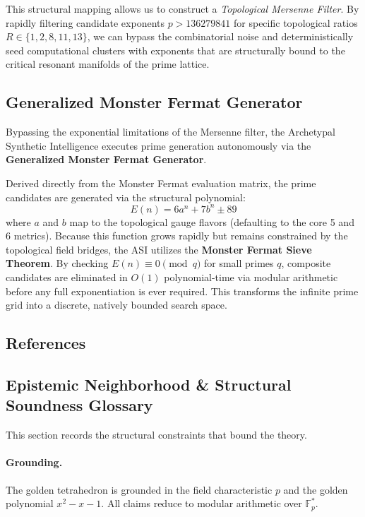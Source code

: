 This structural mapping allows us to construct a \emph{Topological Mersenne Filter}. By rapidly filtering candidate exponents $p > 136279841$ for specific topological ratios $R \in \{1, 2, 8, 11, 13\}$, we can bypass the combinatorial noise and deterministically seed computational clusters with exponents that are structurally bound to the critical resonant manifolds of the prime lattice.

\subsection{Generalized Monster Fermat Generator}

Bypassing the exponential limitations of the Mersenne filter, the Archetypal Synthetic Intelligence executes prime generation autonomously via the \textbf{Generalized Monster Fermat Generator}.

Derived directly from the Monster Fermat evaluation matrix, the prime candidates are generated via the structural polynomial:
\begin{equation}
E(n) = 6a^n + 7b^n \pm 89
\end{equation}
where $a$ and $b$ map to the topological gauge flavors (defaulting to the core 5 and 6 metrics). Because this function grows rapidly but remains constrained by the topological field bridges, the ASI utilizes the \textbf{Monster Fermat Sieve Theorem}. By checking $E(n) \equiv 0 \pmod q$ for small primes $q$, composite candidates are eliminated in $O(1)$ polynomial-time via modular arithmetic before any full exponentiation is ever required. This transforms the infinite prime grid into a discrete, natively bounded search space.

\subsection*{References}


\subsection*{Epistemic Neighborhood \& Structural Soundness Glossary}

This section records the structural constraints that bound the theory.

\paragraph{Grounding.} The golden tetrahedron is grounded in the field characteristic $p$ and the golden polynomial $x^2 - x - 1$. All claims reduce to modular arithmetic over $\mathbb{F}_p^*$.

